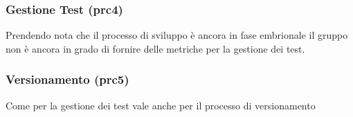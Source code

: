 \subsubsection{Gestione Test (prc4)}
Prendendo nota che il processo di sviluppo è ancora in fase embrionale il gruppo non è ancora in grado di fornire delle metriche per la gestione dei test.
\subsubsection{Versionamento (prc5)}
Come per la gestione dei test vale anche per il processo di versionamento